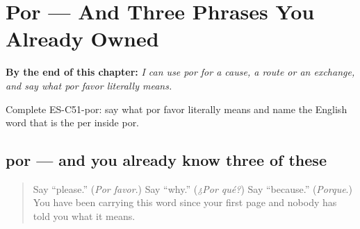 
\chapter{Por --- And Three Phrases You Already Owned}
\label{ch:por}

\begin{chapteropening}
\textbf{By the end of this chapter:} \emph{I can use por for a cause, a route or an exchange, and say what por favor literally means.}

Complete ES-C51-por: say what por favor literally means and name the English word that is the per inside por.
\end{chapteropening}

\section[por]{por — and you already know three of these}

\label{lesson:ES-C51-por}



\begin{quote}
Say \textquotedblleft{}please.\textquotedblright{} (\emph{Por favor}.) Say \textquotedblleft{}why.\textquotedblright{} (\emph{¿Por qué?}) Say \textquotedblleft{}because.\textquotedblright{} (\emph{Porque}.) You have been carrying this word since your first page and nobody has told you what it means.
\end{quote}

